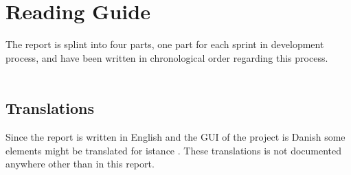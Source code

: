 
\section*{Reading Guide}

The report is splint into four parts, one part for each sprint in development process, and have been written in chronological order regarding this process. 
\\\\
\subsection{Translations}
\label{sub:translations}
Since the report is written in English and the GUI of the project is Danish some elements might be translated for istance 
. These translations is not documented anywhere other than in this report.
